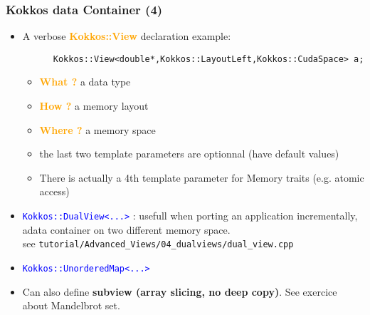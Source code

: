 \begin{frame}[fragile=singleslide]
  \frametitle{Kokkos data Container (4)}

  \begin{itemize}
  \item A verbose  \textcolor{orange}{\textbf{Kokkos::View}} declaration example:
    \begin{verbatim}
      Kokkos::View<double*,Kokkos::LayoutLeft,Kokkos::CudaSpace> a;
    \end{verbatim}
    \begin{itemize}
    \item \textcolor{orange}{\textbf{What ?}} a data type
    \item \textcolor{orange}{\textbf{How ?}} a memory layout
    \item \textcolor{orange}{\textbf{Where ?}} a memory space
    \item the last two template parameters are optionnal (have default values)
    \item There is actually a 4th template parameter for Memory traits (e.g. atomic access)
    \end{itemize}
  \item \textcolor{blue}{\texttt{Kokkos::DualView<...>}} : usefull when porting an application incrementally, adata container on two different memory space.\\
    see \texttt{tutorial/Advanced\_Views/04\_dualviews/dual\_view.cpp}
  \item \textcolor{blue}{\texttt{Kokkos::UnorderedMap<...>}}
  \item Can also define \textbf{subview (array slicing, no deep copy)}. See exercice about Mandelbrot set.
  \end{itemize}
  
\end{frame}

